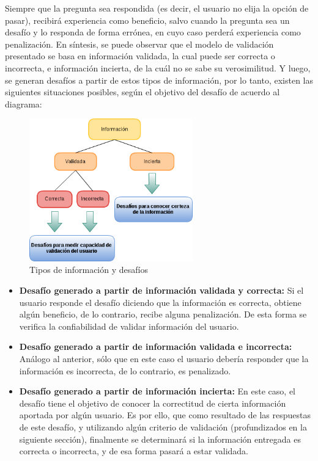 \documentclass[10pt,letterpaper]{article}
\begin{document}
  Siempre que la pregunta sea respondida (es decir, el usuario no elija la opción de pasar), recibirá experiencia como beneficio, salvo cuando la pregunta sea un desafío y lo responda de forma errónea, en cuyo caso perderá experiencia como penalización.
\newpage
En síntesis, se puede observar que el modelo de validación presentado se basa en información validada, la cual puede ser correcta o incorrecta, e información incierta, de la cuál no se sabe su verosimilitud. Y luego, se generan desafíos a partir de estos tipos de información, por lo tanto, existen las siguientes situaciones posibles, según el objetivo del desafío de acuerdo al diagrama:\\


\begin{figure}[h]
\begin{center}
\includegraphics[width=200pt]{./imgs/Info.png}
\caption{Tipos de información y desafíos}
\end{center}
\end{figure}

\begin{itemize}
 \item \textbf{Desafío generado a partir de información validada y correcta:} Si el usuario responde el desafío diciendo que la información es correcta, obtiene algún beneficio, de lo contrario, recibe alguna penalización. De esta forma se verifica la confiabilidad de validar información del usuario.
 \item \textbf{Desafío generado a partir de información validada e incorrecta:} Análogo al anterior, sólo que en este caso el usuario debería responder que la información es incorrecta, de lo contrario, es penalizado.
 \item \textbf{Desafío generado a partir de información incierta:} En este caso, el desafío tiene el objetivo de conocer la correctitud de cierta información aportada por algún usuario. Es por ello, que como resultado de las respuestas de este desafío, y utilizando algún criterio de validación (profundizados en la siguiente sección), finalmente se determinará si la información entregada es correcta o incorrecta, y de esa forma pasará a estar validada.\\
\end{itemize}
\end{document}
